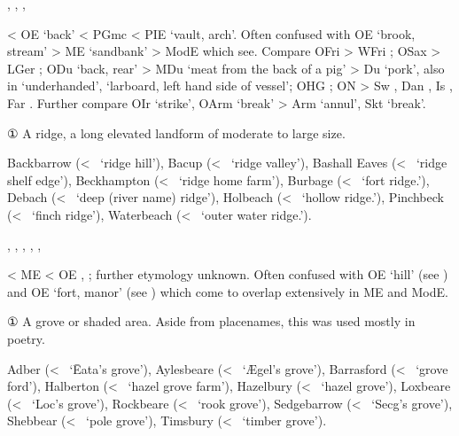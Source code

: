 \documentclass[12pt,letterpaper,oneside,article,draft]{memoir}
\begin{document}
\begin{Lemma}
\begin{Also}
, , , 
\end{Also}
\begin{Etymology}
	< OE  ‘back’ < PGmc  < PIE  ‘vault, arch’.
	Often confused with OE  ‘brook, stream’ > ME  ‘sandbank’ > ModE 
		which see.
	Compare
	OFri  > WFri ;
	OSax  > LGer ;
	ODu  ‘back, rear’ > MDu  ‘meat from the back of a pig’ >
		Du  ‘pork’, also in  ‘underhanded’,
		 ‘larboard, left hand side of vessel’;
	OHG ;
	ON  > Sw , Dan , Is , Far .
	Further compare
	OIr  ‘strike’,
	OArm   ‘break’ > Arm   ‘annul’,
	Skt   ‘break’.
\end{Etymology}
\begin{Definitions}
	① A ridge, a long elevated landform of moderate to large size. 
\end{Definitions}
\begin{Examples}
	Backbarrow (<~ ‘ridge hill’), Bacup (<~ ‘ridge valley’), Bashall Eaves (<~ ‘ridge shelf edge’), Beckhampton (<~ ‘ridge home farm’), Burbage (<~ ‘fort ridge.’), Debach (<~ ‘deep (river name) ridge’), Holbeach (<~ ‘hollow ridge.’), Pinchbeck (<~ ‘finch ridge’), Waterbeach (<~ ‘outer water ridge.’).
\end{Examples}
\end{Lemma}

\begin{Lemma}
\begin{Also}
	, , , , , 
\end{Also}
\begin{Etymology}
	< ME  < OE , ; further etymology unknown.
	Often confused with OE  ‘hill’ (see ) and OE  ‘fort, manor’ (see )
		which come to overlap extensively in ME and ModE.
\end{Etymology}
\begin{Definitions}
	① A grove or shaded area. Aside from placenames, this was used mostly in poetry.
\end{Definitions}
\begin{Examples}
	Adber (<~ ‘Ēata’s grove’), Aylesbeare (<~ ‘Ægel’s grove’), Barrasford (<~ ‘grove ford’), Halberton (<~ ‘hazel grove farm’), Hazelbury (<~ ‘hazel grove’), Loxbeare (<~ ‘Loc’s grove’), Rockbeare (<~ ‘rook grove’), Sedgebarrow (<~ ‘Secg’s grove’), Shebbear (<~ ‘pole grove’), Timsbury (<~ ‘timber grove’).
\end{Examples}
\end{Lemma}
\end{document}
